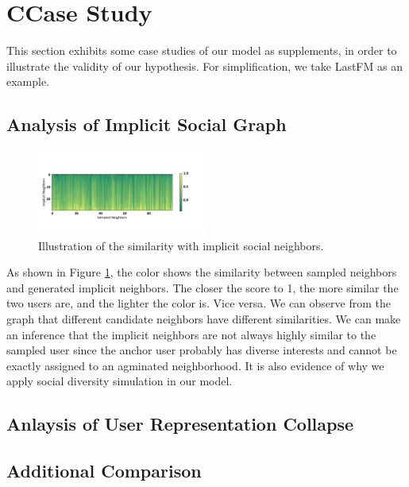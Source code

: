 \documentclass[letterpaper]{article} %
\begin{document}
\section{C{\quad}Case Study}
This section exhibits some case studies of our model as supplements, in order to illustrate the validity of our hypothesis. For simplification, we take LastFM as an example. 
\subsection{Analysis of Implicit Social Graph}
\begin{figure}[ht!]
  \centering
  \includegraphics[width=0.5\textwidth]{implicit.pdf} %
  \caption{Illustration of the similarity with implicit social neighbors.}
  \label{fig_implicit}
\end{figure}
\noindent As shown in Figure \ref{fig_implicit}, the color shows the similarity between sampled neighbors and generated implicit neighbors. The closer the score to 1, the more similar the two users are, and the lighter the color is. Vice versa. We can observe from the graph that different candidate neighbors have different similarities. We can make an inference that the implicit neighbors are not always highly similar to the sampled user since the anchor user probably has diverse interests and cannot be exactly assigned to an agminated neighborhood. It is also evidence of why we apply social diversity simulation in our model.

\subsection{Anlaysis of User Representation Collapse}
\subsection{Additional Comparison}
\end{document}
